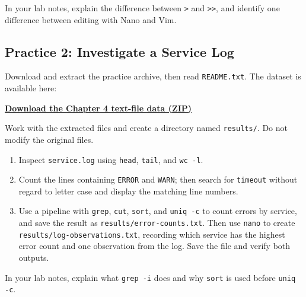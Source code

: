 In your lab notes, explain the difference between \texttt{>} and \texttt{>>}, and identify one difference between editing with Nano and Vim.

\subsection{Practice 2: Investigate a Service Log}
Download and extract the practice archive, then read \texttt{README.txt}. The dataset is available here:
\begin{center}
    \href{https://github.com/Teoyed/OS-Lab-Book/raw/refs/heads/main/Resources/chapter4-text-lab-data.zip}{\textbf{Download the Chapter 4 text-file data (ZIP)}}
\end{center}
Work with the extracted files and create a directory named \texttt{results/}. Do not modify the original files.
\begin{enumerate}
    \item Inspect \texttt{service.log} using \texttt{head}, \texttt{tail}, and \texttt{wc -l}.
    \item Count the lines containing \texttt{ERROR} and \texttt{WARN}; then search for \texttt{timeout} without regard to letter case and display the matching line numbers.
    \item Use a pipeline with \texttt{grep}, \texttt{cut}, \texttt{sort}, and \texttt{uniq -c} to count errors by service, and save the result as \texttt{results/error-counts.txt}. Then use \texttt{nano} to create \texttt{results/log-observations.txt}, recording which service has the highest error count and one observation from the log. Save the file and verify both outputs.
\end{enumerate}

In your lab notes, explain what \texttt{grep -i} does and why \texttt{sort} is used before \texttt{uniq -c}.

